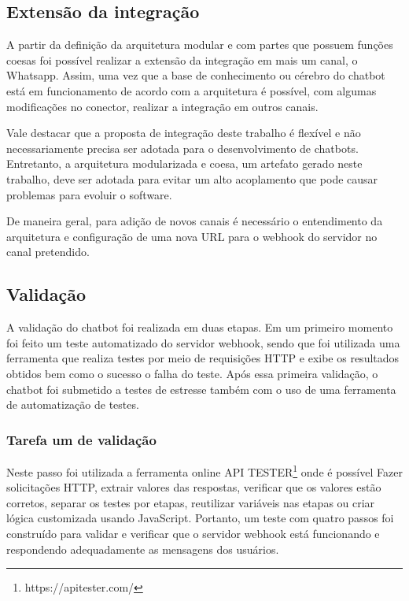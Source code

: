 \subsection{Extensão da integração}

A partir da definição da arquitetura modular e com partes que possuem funções coesas foi possível realizar a extensão da integração em mais um canal, o Whatsapp. Assim, uma vez que a base de conhecimento ou cérebro do chatbot está em funcionamento de acordo com a arquitetura é possível, com algumas modificações no conector, realizar a integração em outros canais. 

Vale destacar que a proposta de integração deste trabalho é flexível e não necessariamente precisa ser adotada para o desenvolvimento de chatbots. Entretanto, a arquitetura modularizada e coesa, um artefato gerado neste trabalho, deve ser adotada para evitar um alto acoplamento que pode causar problemas para evoluir o software.

De maneira geral, para adição de novos canais é necessário o entendimento da arquitetura e configuração de uma nova URL para o webhook do servidor no canal pretendido.


\subsection{Validação}

A validação do chatbot foi realizada em duas etapas. Em um primeiro momento foi feito um teste automatizado do servidor webhook, sendo que foi utilizada uma ferramenta que realiza testes por meio de requisições HTTP e exibe os resultados obtidos bem como o sucesso o falha do teste. Após essa primeira validação, o chatbot foi submetido a testes de estresse também com o uso de uma ferramenta de automatização de testes.


\subsubsection{Tarefa um de validação}
Neste passo foi utilizada a ferramenta online API TESTER\footnote{https://apitester.com/} onde é possível Fazer solicitações HTTP, extrair valores das respostas, verificar que os valores estão corretos, separar os testes por etapas, reutilizar variáveis nas etapas ou criar lógica customizada usando JavaScript. Portanto, um teste com quatro passos foi construído para validar e verificar que o servidor webhook está funcionando e respondendo adequadamente as mensagens dos usuários.


